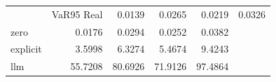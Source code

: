 \begin{tabular}{lrrrr}
\toprule
 & VaR95%
\midrule
Real & 0.0139 & 0.0265 & 0.0219 & 0.0326 \\
zero & 0.0176 & 0.0294 & 0.0252 & 0.0382 \\
explicit & 3.5998 & 6.3274 & 5.4674 & 9.4243 \\
llm & 55.7208 & 80.6926 & 71.9126 & 97.4864 \\
\bottomrule
\end{tabular}
